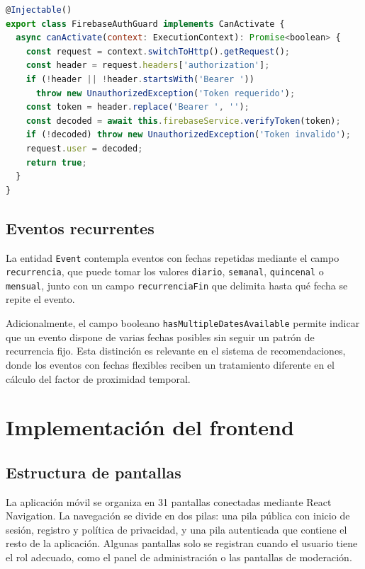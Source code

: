 \begin{lstlisting}[language=JavaScript, caption={Guard de autenticación Firebase en NestJS}]
@Injectable()
export class FirebaseAuthGuard implements CanActivate {
  async canActivate(context: ExecutionContext): Promise<boolean> {
    const request = context.switchToHttp().getRequest();
    const header = request.headers['authorization'];
    if (!header || !header.startsWith('Bearer '))
      throw new UnauthorizedException('Token requerido');
    const token = header.replace('Bearer ', '');
    const decoded = await this.firebaseService.verifyToken(token);
    if (!decoded) throw new UnauthorizedException('Token invalido');
    request.user = decoded;
    return true;
  }
}
\end{lstlisting}

\subsection{Eventos recurrentes}

La entidad \texttt{Event} contempla eventos con fechas repetidas mediante el campo \texttt{recurrencia}, que puede tomar los valores \texttt{diario}, \texttt{semanal}, \texttt{quincenal} o \texttt{mensual}, junto con un campo \texttt{recurrenciaFin} que delimita hasta qué fecha se repite el evento.

Adicionalmente, el campo booleano \texttt{hasMultipleDatesAvailable} permite indicar que un evento dispone de varias fechas posibles sin seguir un patrón de recurrencia fijo. Esta distinción es relevante en el sistema de recomendaciones, donde los eventos con fechas flexibles reciben un tratamiento diferente en el cálculo del factor de proximidad temporal.

\section{Implementación del frontend}

\subsection{Estructura de pantallas}

La aplicación móvil se organiza en 31 pantallas conectadas mediante React Navigation. La navegación se divide en dos pilas: una pila pública con inicio de sesión, registro y política de privacidad, y una pila autenticada que contiene el resto de la aplicación. Algunas pantallas solo se registran cuando el usuario tiene el rol adecuado, como el panel de administración o las pantallas de moderación.

